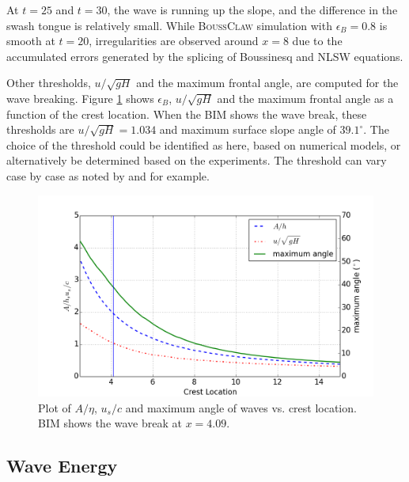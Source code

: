 \documentclass[review]{elsarticle}
\newcommand{\BoussClaw}{\textsc{BoussClaw} }
\begin{document}
At $t=25$ and $t=30$, the wave is running up the slope, 
and the difference in the swash tongue is relatively small. 
While \BoussClaw simulation with $\epsilon_B=0.8$ is
smooth at $t=20$, irregularities are observed
around $x=8$ due to the accumulated errors generated by the splicing of 
Boussinesq and NLSW equations.%

Other thresholds, $u/\sqrt{gH}$ and the maximum frontal angle,
are computed for the wave breaking.  
Figure \ref{fig:wave_break_criteria} shows 
$\epsilon_B$, $u/\sqrt{gH}$ and the maximum frontal angle 
as a function of the crest location.
When the BIM shows the wave break, 
these thresholds are 
$u/\sqrt{gH} = 1.034$ and maximum surface slope angle of $39.1^\circ$.
The choice of the threshold could be identified as here, 
based on numerical models, 
or alternatively be determined based on the experiments.
The threshold can vary case by case as noted
by \cite{lynett2006nearshore} and \cite{matsuyama2007study} 
for example. 

\begin{figure}[tbh!]
\centering
\includegraphics[width=.7\textwidth]{_fig/wave_break}
\caption{Plot of $A/\eta$, $u_s/c$ and maximum angle of waves vs. crest location. 
BIM shows the wave break at $x=4.09$. }
\label{fig:wave_break_criteria}
\end{figure}

\subsection{Wave Energy}
\end{document}
